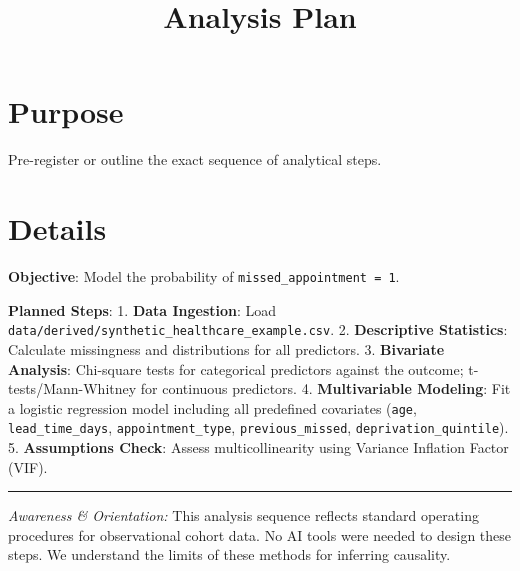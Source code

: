 \documentclass[
]{report}
\title{Analysis Plan}
\author{}
\date{}
\renewcommand*\contentsname{Table of contents}
\newcommand\contentsname{Table of contents}
\begin{document}
\maketitle

\renewcommand*\contentsname{Table of contents}
{
\hypersetup{linkcolor=}
\setcounter{tocdepth}{2}
\tableofcontents
}

\chapter{Purpose}\label{purpose}

Pre-register or outline the exact sequence of analytical steps.

\chapter{Details}\label{details}

\textbf{Objective}: Model the probability of
\texttt{missed\_appointment\ =\ 1}.

\textbf{Planned Steps}: 1. \textbf{Data Ingestion}: Load
\texttt{data/derived/synthetic\_healthcare\_example.csv}. 2.
\textbf{Descriptive Statistics}: Calculate missingness and distributions
for all predictors. 3. \textbf{Bivariate Analysis}: Chi-square tests for
categorical predictors against the outcome; t-tests/Mann-Whitney for
continuous predictors. 4. \textbf{Multivariable Modeling}: Fit a
logistic regression model including all predefined covariates
(\texttt{age}, \texttt{lead\_time\_days}, \texttt{appointment\_type},
\texttt{previous\_missed}, \texttt{deprivation\_quintile}). 5.
\textbf{Assumptions Check}: Assess multicollinearity using Variance
Inflation Factor (VIF).

\begin{center}\rule{0.5\linewidth}{0.5pt}\end{center}

\begin{tcolorbox}[enhanced jigsaw, toptitle=1mm, opacityback=0, colback=white, opacitybacktitle=0.6, title=\textcolor{quarto-callout-note-color}{\faInfo}\hspace{0.5em}{AI Capability Checkpoint}, left=2mm, bottomrule=.15mm, colframe=quarto-callout-note-color-frame, breakable, titlerule=0mm, bottomtitle=1mm, arc=.35mm, rightrule=.15mm, coltitle=black, colbacktitle=quarto-callout-note-color!10!white, toprule=.15mm, leftrule=.75mm]

\emph{Awareness \& Orientation:} This analysis sequence reflects
standard operating procedures for observational cohort data. No AI tools
were needed to design these steps. We understand the limits of these
methods for inferring causality.

\end{tcolorbox}
\end{document}
